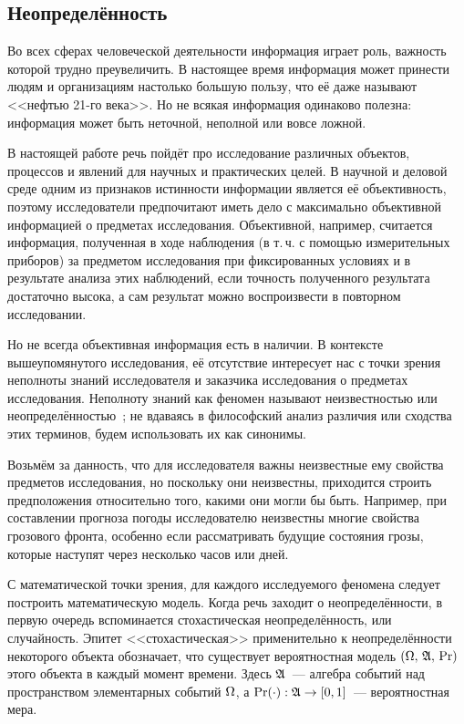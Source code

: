 
\subsection{Неопределённость}
\label{sec:intro_uncertainty}

Во всех сферах человеческой деятельности информация играет роль, важность которой трудно преувеличить. В настоящее время информация  может принести людям и организациям настолько большую пользу, что её даже называют <<нефтью 21-го века>>. Но не всякая информация одинаково полезна: информация может быть неточной, неполной или вовсе ложной.  

В настоящей работе речь пойдёт про исследование различных объектов, процессов и явлений для научных и практических целей. В научной и деловой среде одним из признаков истинности информации является её объективность, поэтому исследователи предпочитают иметь дело с максимально объективной информацией о предметах исследования.  Объективной, например, считается информация, полученная в ходе наблюдения (в т.\,ч. с помощью измерительных приборов) за предметом исследования при фиксированных условиях и в результате анализа этих наблюдений, если точность полученного результата достаточно высока, а сам результат можно воспроизвести в повторном исследовании. 
  
Но не всегда объективная информация есть в наличии. В контексте вышеупомянутого исследования, её отсутствие интересует нас с точки зрения неполноты знаний исследователя и заказчика исследования о предметах исследования. Неполноту знаний как феномен называют неизвестностью или неопределённостью~\cite{falomkina}; не вдаваясь в философский анализ различия или сходства этих терминов, будем использовать их как синонимы.  

Возьмём за данность, что для исследователя важны неизвестные ему свойства предметов исследования, но поскольку они неизвестны, приходится строить предположения относительно того, какими они могли бы быть. Например, при составлении прогноза погоды исследователю неизвестны многие свойства грозового фронта, особенно если рассматривать будущие состояния грозы, которые наступят через несколько часов или дней.

С математической точки зрения, для каждого исследуемого феномена следует построить математическую модель.  Когда речь заходит о неопределённости, в первую очередь вспоминается стохастическая неопределённость, или случайность. Эпитет <<стохастическая>> применительно к неопределённости некоторого объекта обозначает, что существует вероятностная модель ${(\Omega,\,{\mathfrak{A}},\,{\mathrm{Pr}})}$ этого объекта в каждый момент времени. Здесь ${\mathfrak{A}}$~--- алгебра событий над пространством элементарных событий $\Omega$, а ${\mathrm{Pr}}(\cdot): {\mathfrak{A}} \to [0,1]$~--- вероятностная мера. 

